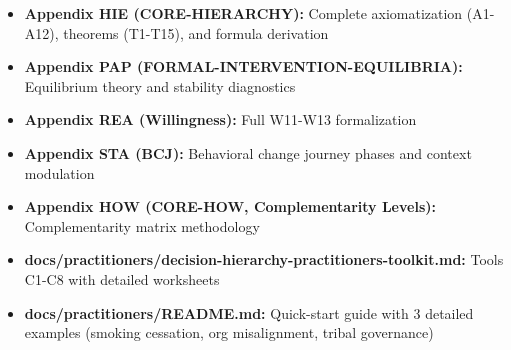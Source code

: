 \documentclass[11pt, a4paper]{article}
\begin{document}
\begin{itemize}[nosep]
    \item \textbf{Appendix HIE (CORE-HIERARCHY):} Complete axiomatization (A1-A12), theorems (T1-T15), and formula derivation
    \item \textbf{Appendix PAP (FORMAL-INTERVENTION-EQUILIBRIA):} Equilibrium theory and stability diagnostics
    \item \textbf{Appendix REA (Willingness):} Full W11-W13 formalization
    \item \textbf{Appendix STA (BCJ):} Behavioral change journey phases and context modulation
    \item \textbf{Appendix HOW (CORE-HOW, Complementarity Levels):} Complementarity matrix methodology
    \item \textbf{docs/practitioners/decision-hierarchy-practitioners-toolkit.md:} Tools C1-C8 with detailed worksheets
    \item \textbf{docs/practitioners/README.md:} Quick-start guide with 3 detailed examples (smoking cessation, org misalignment, tribal governance)
\end{itemize}
\end{document}
